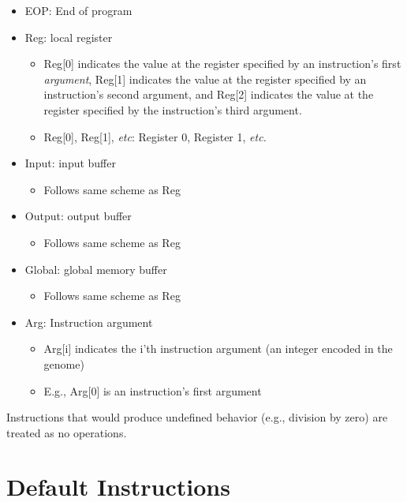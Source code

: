 \documentclass[
]{book}
\providecommand{\tightlist}{%
  \setlength{\itemsep}{0pt}\setlength{\parskip}{0pt}}
\begin{document}
\begin{itemize}
\tightlist
\item
  EOP: End of program
\item
  Reg: local register

  \begin{itemize}
  \tightlist
  \item
    Reg{[}0{]} indicates the value at the register specified by an instruction's first \emph{argument}, Reg{[}1{]} indicates the value at the register specified by an instruction's second argument, and Reg{[}2{]} indicates the value at the register specified by the instruction's third argument.
  \item
    Reg{[}0{]}, Reg{[}1{]}, \emph{etc}: Register 0, Register 1, \emph{etc.}
  \end{itemize}
\item
  Input: input buffer

  \begin{itemize}
  \tightlist
  \item
    Follows same scheme as Reg
  \end{itemize}
\item
  Output: output buffer

  \begin{itemize}
  \tightlist
  \item
    Follows same scheme as Reg
  \end{itemize}
\item
  Global: global memory buffer

  \begin{itemize}
  \tightlist
  \item
    Follows same scheme as Reg
  \end{itemize}
\item
  Arg: Instruction argument

  \begin{itemize}
  \tightlist
  \item
    Arg{[}i{]} indicates the i'th instruction argument (an integer encoded in the genome)
  \item
    E.g., Arg{[}0{]} is an instruction's first argument
  \end{itemize}
\end{itemize}

Instructions that would produce undefined behavior (e.g., division by zero) are treated as no operations.

\hypertarget{default-instructions}{%
\section{Default Instructions}\label{default-instructions}}
\end{document}
